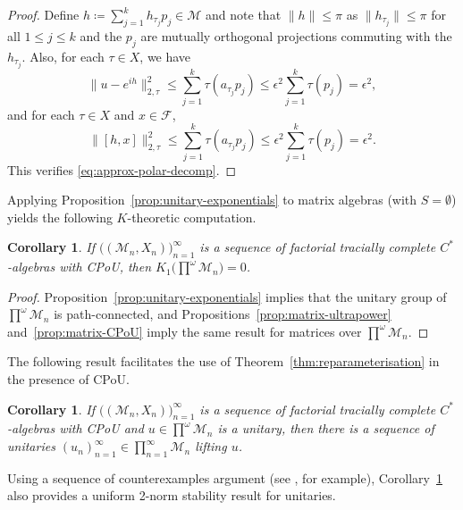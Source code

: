 \documentclass[a4paper,11pt]{amsart}
\newtheorem{corollary}[theorem]{Corollary}
\theoremstyle{definition}
\numberwithin{equation}{section}
\numberwithin{theorem}{section}
\newcommand{\M}{\mathcal{M}}
\begin{document}
\begin{proof}
	Define $h \coloneqq \sum_{j=1}^k h_{\tau_j} p_j \in \M$ and note that $\|h\| \leq \pi$ as $\|h_{\tau_j}\| \leq \pi$ for all $1 \leq j \leq k$ and the $p_j$ are mutually orthogonal projections commuting with the $h_{\tau_j}$.  Also, for each $\tau \in X$, we have
	\begin{equation}
		\|u - e^{ih}\|_{2, \tau}^2 \leq \sum_{j=1}^k \tau(a_{\tau_j} p_j) \leq \epsilon^2 \sum_{j=1}^k \tau(p_j) = \epsilon^2,
	\end{equation}
	and for each $\tau \in X$ and $x \in \mathcal F$,
	\begin{equation}
		\|[h, x]\|_{2, \tau}^2 \leq \sum_{j=1}^k \tau(a_{\tau_j} p_j) \leq \epsilon^2 \sum_{j=1}^k \tau(p_j) = \epsilon^2.
	\end{equation}
	This verifies \eqref{eq:approx-polar-decomp}.
\end{proof}

Applying Proposition~\ref{prop:unitary-exponentials} to matrix algebras (with $S = \emptyset$) yields the following $K$-theoretic computation.

\begin{corollary}
	If $\big((\M_n, X_n)\big)_{n=1}^\infty$ is a sequence of factorial tracially complete $C^*$-algebras with CPoU, then $K_1\big(\prod^\omega \M_n\big) = 0$.
\end{corollary}

\begin{proof}
	Proposition~\ref{prop:unitary-exponentials} implies that the unitary group of $\prod^\omega \M_n$ is path-connected, and Propositions~\ref{prop:matrix-ultrapower} and~\ref{prop:matrix-CPoU} imply the same result for matrices over $\prod^\omega \M_n$.
\end{proof}

The following result facilitates the use of Theorem~\ref{thm:reparameterisation} in the presence of CPoU. 

\begin{corollary}\label{cor:unitary-stable-relation}
	If $\big((\M_n, X_n)\big)_{n=1}^\infty$ is a sequence of factorial tracially complete $C^*$-algebras with CPoU and $u \in \prod^\omega \M_n$ is a unitary, then there is a sequence of unitaries $(u_n)_{n=1}^\infty \in \prod_{n=1}^\infty \M_n$ lifting $u$.
\end{corollary}

Using a sequence of counterexamples argument (see \cite{Loring97}, for example), Corollary~\ref{cor:unitary-stable-relation} also provides a uniform 2-norm stability result for unitaries.
\end{document}
